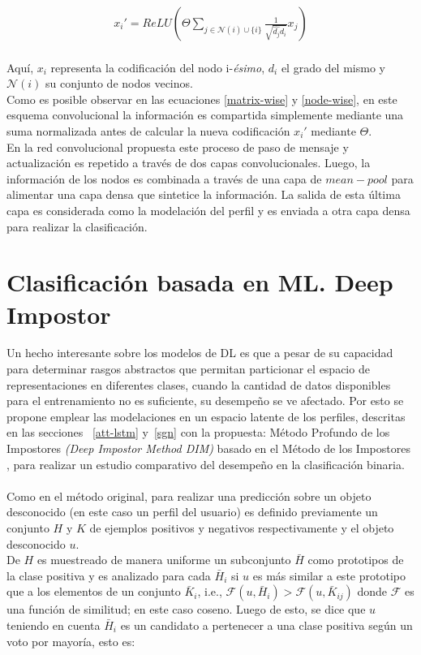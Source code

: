 	 \begin{align}\label{node-wise}
	 	x_i' = ReLU\left( \Theta \sum_{j \in \mathcal{N}(i) \cup \{i\}} \frac{1}{ 	\sqrt{ \hat{d_j} \hat{d_i} } }x_j \right)
	 \end{align}
	 \\
	 Aquí, $x_i$ representa la codificación del nodo i-\textit{\'{e}simo}, $d_i$ el grado del mismo y $\mathcal{N}(i)$ su conjunto de nodos vecinos.
	 \\ 
	 Como es posible observar en las ecuaciones \ref{matrix-wise} y \ref{node-wise}, en este esquema convolucional la información es compartida simplemente mediante una suma normalizada antes de calcular la nueva codificación $x_i'$ mediante $\Theta$.
	 \\
	 En la red convolucional propuesta este proceso de paso de mensaje y actualización es repetido a través de dos capas convolucionales. Luego, la información de los nodos es combinada a través de una capa de $mean-pool$ para alimentar una capa densa que sintetice la información. La salida de esta última capa es considerada como la modelación del perfil y es enviada a otra capa densa para realizar la clasificación.
	 
	 \section{Clasificación basada en ML. Deep Impostor }
	 
	 Un hecho interesante sobre los modelos de DL es que a pesar de su capacidad para determinar rasgos abstractos que permitan particionar el espacio de representaciones en diferentes clases, cuando la cantidad de datos disponibles para el entrenamiento no es suficiente, su desempeño se ve afectado. Por esto se propone emplear las modelaciones  en un espacio latente de los perfiles, descritas en las secciones ~\ref{att-lstm} y~\ref{sgn} con la propuesta: Método Profundo de los Impostores \textit{(Deep Impostor Method DIM)} basado en el Método de los Impostores \citep{seidman2013authorship}, para realizar un estudio comparativo del desempeño en la clasificación binaria.
	 \\\\
	 Como en el método original, para realizar una predicción sobre un objeto desconocido (en este caso un perfil del usuario) es definido previamente un conjunto $H$ y $K$ de ejemplos positivos y negativos respectivamente y el objeto desconocido $u$.
	 \\
	 De $H$ es muestreado de manera uniforme un subconjunto $\bar{H}$ como prototipos de la clase positiva y es analizado para cada $\bar{H}_i$ si $u$ es más similar a este prototipo que a los elementos de un conjunto $\bar{K}_i$, i.e., $\mathcal{F}(u, \bar{H}_i) > \mathcal{F}(u, \bar{K}_{ij})$ donde $\mathcal{F}$ es una función de similitud; en este caso coseno. Luego de esto, se dice que $u$ teniendo en cuenta $\bar{H}_i$ es un candidato a pertenecer a una clase positiva según un voto por mayoría, esto es:
	 
